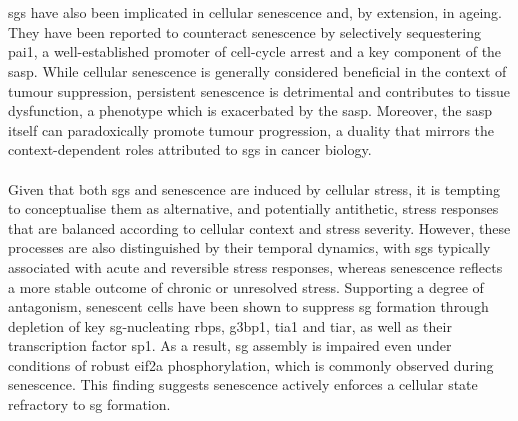 \\
\\
\glspl{sg} have also been implicated in cellular senescence and, by extension, in ageing. They have been reported to counteract senescence by selectively sequestering \gls{pai1}\cite{omer_stress_2018}, a well-established promoter of cell-cycle arrest and a key component of the \gls{sasp}\cite{omer_stress_2018}. While cellular senescence is generally considered beneficial in the context of tumour suppression, persistent senescence is detrimental and contributes to tissue dysfunction, a phenotype which is exacerbated by the \gls{sasp}\cite{martins-silva_exploring_2025}. Moreover, the \gls{sasp} itself can paradoxically promote tumour progression\cite{martins-silva_exploring_2025}, a duality that mirrors the context-dependent roles attributed to \glspl{sg} in cancer biology\cite{anderson_stress_2015}.
\\
\\
Given that both \glspl{sg} and senescence are induced by cellular stress\cite{omer_g3bp1_2020}, it is tempting to conceptualise them as alternative, and potentially antithetic, stress responses that are balanced according to cellular context and stress severity. However, these processes are also distinguished by their temporal dynamics, with \glspl{sg} typically associated with acute and reversible stress responses, whereas senescence reflects a more stable outcome of chronic or unresolved stress\cite{omer_g3bp1_2020, moujaber_dissecting_2017}. Supporting a degree of antagonism, senescent cells have been shown to suppress \gls{sg} formation through depletion of key \gls{sg}-nucleating \glspl{rbp}, \gls{g3bp1}, \gls{tia1} and \gls{tiar}, as well as their transcription factor \gls{sp1}\cite{moujaber_dissecting_2017}. As a result, \gls{sg} assembly is impaired even under conditions of robust \gls{eif2a} phosphorylation, which is commonly observed during senescence\cite{moujaber_dissecting_2017}. This finding suggests senescence actively enforces a cellular state refractory to \gls{sg} formation\cite{omer_stress_2018, moujaber_dissecting_2017}.
\\
\\
